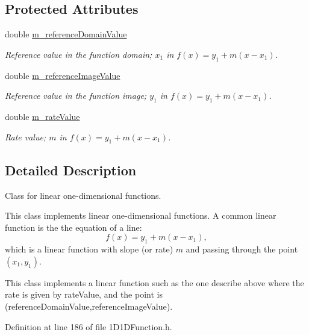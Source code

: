 \subsection*{Protected Attributes}
\begin{DoxyCompactItemize}
\item 
double \hyperlink{class_q_u_e_s_o_1_1_linear1_d1_d_function_a9ff67ad29df205d2c78e3431b062ccb2}{m\-\_\-reference\-Domain\-Value}
\begin{DoxyCompactList}\small\item\em Reference value in the function domain; $ x_1 $ in $ f(x) = y_1 + m (x - x_1)$. \end{DoxyCompactList}\item 
double \hyperlink{class_q_u_e_s_o_1_1_linear1_d1_d_function_abb210b107ac3ad9473b8c597808b1ba9}{m\-\_\-reference\-Image\-Value}
\begin{DoxyCompactList}\small\item\em Reference value in the function image; $ y_1 $ in $ f(x) = y_1 + m (x - x_1)$. \end{DoxyCompactList}\item 
double \hyperlink{class_q_u_e_s_o_1_1_linear1_d1_d_function_aa593d204ade4bf240d0353eaf9f10fd0}{m\-\_\-rate\-Value}
\begin{DoxyCompactList}\small\item\em Rate value; $ m$ in $f(x) = y_1 + m (x - x_1)$. \end{DoxyCompactList}\end{DoxyCompactItemize}


\subsection{Detailed Description}
Class for linear one-\/dimensional functions. 

This class implements linear one-\/dimensional functions. A common linear function is the the equation of a line\-: \[f(x) = y_1 + m (x - x_1), \] which is a linear function with slope (or rate) $ m $ and passing through the point $(x_1,y_1)$.

This class implements a linear function such as the one describe above where the rate is given by {\ttfamily rate\-Value}, and the point is {\ttfamily (reference\-Domain\-Value,reference\-Image\-Value)}. 

Definition at line 186 of file 1\-D1\-D\-Function.\-h.



